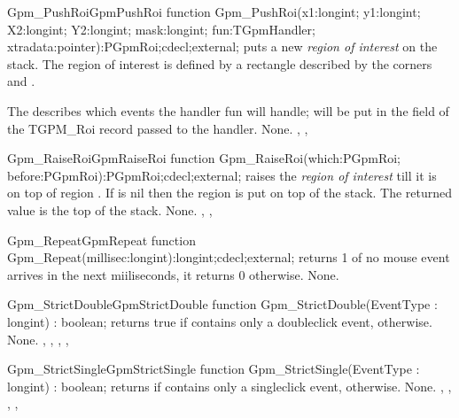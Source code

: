 \begin{functionl}{Gpm\_PushRoi}{GpmPushRoi}
\Declaration
function Gpm\_PushRoi(x1:longint; y1:longint; X2:longint; Y2:longint; mask:longint; fun:TGpmHandler; xtradata:pointer):PGpmRoi;cdecl;external;
\Description
{} puts a new {\em region of interest} on the stack.
The region of interest is defined by a rectangle described by the corners
 and . 

The  describes which events the handler {fun} will handle;
 will be put in the  field of the {TGPM\_Roi} 
record passed to the  handler.
\Errors
None.
\SeeAlso
{},
, 
\end{functionl}

\begin{functionl}{Gpm\_RaiseRoi}{GpmRaiseRoi}
\Declaration
function Gpm\_RaiseRoi(which:PGpmRoi; before:PGpmRoi):PGpmRoi;cdecl;external;
\Description
{} raises the {\em region of interest}  till it
is on top of region . If  is nil then the region is
put on top of the stack. The returned value is the top of the stack.
\Errors
None.
\SeeAlso
{},
, 
\end{functionl}

\begin{functionl}{Gpm\_Repeat}{GpmRepeat}
\Declaration
function Gpm\_Repeat(millisec:longint):longint;cdecl;external;
\Description
{} returns 1 of no mouse event arrives in the next
 miiliseconds, it returns 0 otherwise.
\Errors
None.
\SeeAlso
{}
\end{functionl}

\begin{functionl}{Gpm\_StrictDouble}{GpmStrictDouble}
\Declaration
function Gpm\_StrictDouble(EventType : longint) : boolean;
\Description
{} returns true if  contains only a 
doubleclick event,  otherwise.
\Errors
None.
\SeeAlso
{},
,
,
,
\end{functionl}

\begin{functionl}{Gpm\_StrictSingle}{GpmStrictSingle}
\Declaration
function Gpm\_StrictSingle(EventType : longint) : boolean;
\Description
{} returns  if  contains only a 
singleclick event,  otherwise. 
\Errors
None.
\SeeAlso
{},
,
, 
,
\end{functionl}

